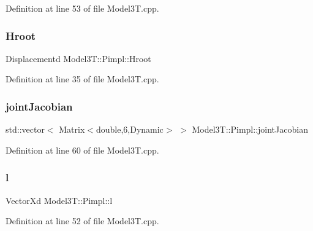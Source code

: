 Definition at line 53 of file Model3\+T.\+cpp.

\hypertarget{structModel3T_1_1Pimpl_a02c47a2c2920e1ddfce6457502061f0b}{}\label{structModel3T_1_1Pimpl_a02c47a2c2920e1ddfce6457502061f0b} 
\subsubsection{\texorpdfstring{Hroot}{Hroot}}
{\footnotesize\ttfamily Displacementd Model3\+T\+::\+Pimpl\+::\+Hroot}



Definition at line 35 of file Model3\+T.\+cpp.

\hypertarget{structModel3T_1_1Pimpl_a8dbebd103170b8f5b8aa5ce4dd383696}{}\label{structModel3T_1_1Pimpl_a8dbebd103170b8f5b8aa5ce4dd383696} 
\subsubsection{\texorpdfstring{joint\+Jacobian}{jointJacobian}}
{\footnotesize\ttfamily std\+::vector$<$ Matrix$<$double,6,Dynamic$>$ $>$ Model3\+T\+::\+Pimpl\+::joint\+Jacobian}



Definition at line 60 of file Model3\+T.\+cpp.

\hypertarget{structModel3T_1_1Pimpl_a7fcae8ba57e320a9066aa9b640f414cb}{}\label{structModel3T_1_1Pimpl_a7fcae8ba57e320a9066aa9b640f414cb} 
\subsubsection{\texorpdfstring{l}{l}}
{\footnotesize\ttfamily Vector\+Xd Model3\+T\+::\+Pimpl\+::l}



Definition at line 52 of file Model3\+T.\+cpp.

\hypertarget{structModel3T_1_1Pimpl_a635ed979bb210444627f06eb65db8f29}{}\label{structModel3T_1_1Pimpl_a635ed979bb210444627f06eb65db8f29} 
